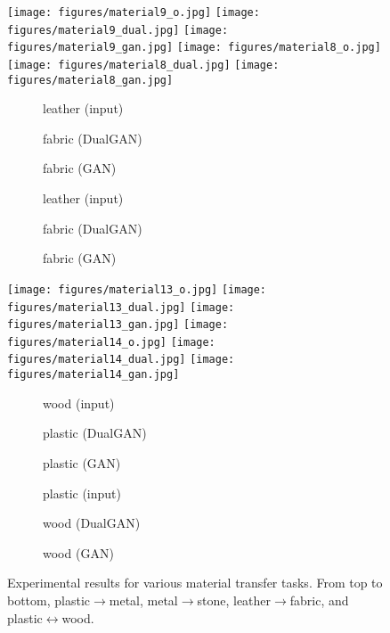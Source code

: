 \begin{figure*}
\begin{center}
\texttt{[image: figures/material9\_o.jpg]}
\texttt{[image: figures/material9\_dual.jpg]}
\texttt{[image: figures/material9\_gan.jpg]}
\texttt{[image: figures/material8\_o.jpg]}
\texttt{[image: figures/material8\_dual.jpg]}
\texttt{[image: figures/material8\_gan.jpg]}

\begin{subfigure}[]{0.13\linewidth}\caption*{leather (input)}\end{subfigure}
\begin{subfigure}[]{0.14\linewidth}\caption*{fabric (DualGAN)}\end{subfigure}
\begin{subfigure}[]{0.13\linewidth}\caption*{fabric (GAN)}\end{subfigure}
\begin{subfigure}[]{0.13\linewidth}\caption*{leather (input)}\end{subfigure}
\begin{subfigure}[]{0.14\linewidth}\caption*{fabric (DualGAN)}\end{subfigure}
\begin{subfigure}[]{0.13\linewidth}\caption*{fabric (GAN)}\end{subfigure}

\texttt{[image: figures/material13\_o.jpg]}
\texttt{[image: figures/material13\_dual.jpg]}
\texttt{[image: figures/material13\_gan.jpg]}
\texttt{[image: figures/material14\_o.jpg]}
\texttt{[image: figures/material14\_dual.jpg]}
\texttt{[image: figures/material14\_gan.jpg]}

\begin{subfigure}[]{0.13\linewidth}\caption*{wood (input)}\end{subfigure}
\begin{subfigure}[]{0.15\linewidth}\caption*{plastic (DualGAN)}\end{subfigure}
\begin{subfigure}[]{0.13\linewidth}\caption*{plastic (GAN)}\end{subfigure}
\begin{subfigure}[]{0.13\linewidth}\caption*{plastic (input)}\end{subfigure}
\begin{subfigure}[]{0.14\linewidth}\caption*{wood (DualGAN)}\end{subfigure}
\begin{subfigure}[]{0.13\linewidth}\caption*{wood (GAN)}\end{subfigure}
\caption{Experimental results for various material transfer tasks. From top to bottom, 
plastic$\rightarrow$metal, metal$\rightarrow$stone, leather$\rightarrow$fabric, and 
plastic$\leftrightarrow$wood.} \label{fig:material}
\end{center}
\end{figure*}


